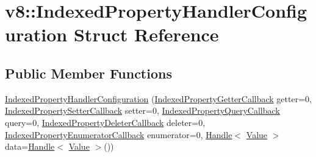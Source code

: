 \hypertarget{structv8_1_1_indexed_property_handler_configuration}{}\section{v8\+:\+:Indexed\+Property\+Handler\+Configuration Struct Reference}
\label{structv8_1_1_indexed_property_handler_configuration}
\subsection*{Public Member Functions}
\begin{DoxyCompactItemize}
\item 
\hyperlink{structv8_1_1_indexed_property_handler_configuration_a5ca9d3cc22ee7d48723465644afe7f3f}{Indexed\+Property\+Handler\+Configuration} (\hyperlink{namespacev8_a48e7816ba64447bf32a25d194588daaf}{Indexed\+Property\+Getter\+Callback} getter=0, \hyperlink{namespacev8_a4ac7cc6185ebc8b6a199f9fa8e6bf5c3}{Indexed\+Property\+Setter\+Callback} setter=0, \hyperlink{namespacev8_a980b62c33eb664783e61e25c3b27f9ee}{Indexed\+Property\+Query\+Callback} query=0, \hyperlink{namespacev8_a53863728de14cde48dd6543207b2f2da}{Indexed\+Property\+Deleter\+Callback} deleter=0, \hyperlink{namespacev8_adbb0a6d5537371953f9ba807d4f6275e}{Indexed\+Property\+Enumerator\+Callback} enumerator=0, \hyperlink{classv8_1_1_handle}{Handle}$<$ \hyperlink{classv8_1_1_value}{Value} $>$ data=\hyperlink{classv8_1_1_handle}{Handle}$<$ \hyperlink{classv8_1_1_value}{Value} $>$())
\end{DoxyCompactItemize}
